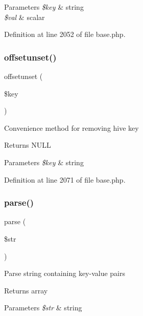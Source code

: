\begin{DoxyParams}{Parameters}
{\em \$key} & string \\
\hline
{\em \$val} & scalar \\
\hline
\end{DoxyParams}


Definition at line 2052 of file base.\+php.

\hypertarget{class_base_a414cd1cb3c09fc06e5e83502f6309dde}{}\label{class_base_a414cd1cb3c09fc06e5e83502f6309dde} 
\subsubsection{\texorpdfstring{offsetunset()}{offsetunset()}}
{\footnotesize\ttfamily offsetunset (\begin{DoxyParamCaption}\item[{}]{\$key }\end{DoxyParamCaption})}

Convenience method for removing hive key \begin{DoxyReturn}{Returns}
N\+U\+LL 
\end{DoxyReturn}

\begin{DoxyParams}{Parameters}
{\em \$key} & string \\
\hline
\end{DoxyParams}


Definition at line 2071 of file base.\+php.

\hypertarget{class_base_a4d0e49aacf195439c437277b22a81062}{}\label{class_base_a4d0e49aacf195439c437277b22a81062} 
\subsubsection{\texorpdfstring{parse()}{parse()}}
{\footnotesize\ttfamily parse (\begin{DoxyParamCaption}\item[{}]{\$str }\end{DoxyParamCaption})}

Parse string containing key-\/value pairs \begin{DoxyReturn}{Returns}
array 
\end{DoxyReturn}

\begin{DoxyParams}{Parameters}
{\em \$str} & string \\
\hline
\end{DoxyParams}


